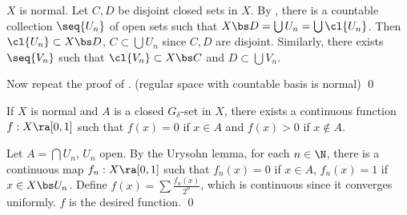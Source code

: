  \(X\) is normal. Let \(C, D\) be disjoint closed sets in \(X\). By , there is a countable collection \(\seq{U_n}\) of open sets such that \(X \bs D = \bigcup U_n = \bigcup \cl{U_n}\). Then \(\cl{U_n} \subset X \bs D\), \(C \subset \bigcup U_n\) since \(C, D\) are disjoint. Similarly, there exists \(\seq{V_n}\) such that \(\cl{V_n} \subset X \bs C\) and \(D \subset \bigcup V_n\).

Now repeat the proof of . (regular space with countable basis is normal) \qed

 If \(X\) is normal and \(A\) is a closed \(G_\delta\)-set in \(X\), there exists a continuous function \(f : X \ra [0, 1]\) such that \(f(x) = 0\) if \(x \in A\) and \(f(x) > 0\) if \(x \notin A\).

\pf Let \(A = \bigcap U_n\), \(U_n\) open. By the Urysohn lemma, for each \(n \in \N\), there is a continuous map \(f_n : X \ra [0, 1]\) such that \(f_n(x) = 0\) if \(x \in A\), \(f_n(x) = 1\) if \(x \in X \bs U_n\). Define \(f(x) = \sum \frac{f_n(x)}{2^n}\), which is continuous since it converges uniformly. \(f\) is the desired function. \qed

\pagebreak
